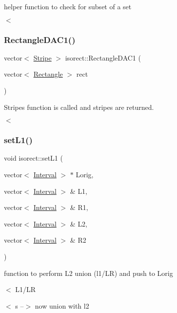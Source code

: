 helper function to check for subset of a set 

$<$ \mbox{\label{classisorect_af4d857e170d1935ef0e2a9b079bd7e57}} 
\subsubsection{\texorpdfstring{Rectangle\+D\+A\+C1()}{RectangleDAC1()}}
{\footnotesize\ttfamily vector$<$ \hyperlink{classStripe}{Stripe} $>$ isorect\+::\+Rectangle\+D\+A\+C1 (\begin{DoxyParamCaption}\item[{vector$<$ \hyperlink{classRectangle}{Rectangle} $>$}]{rect }\end{DoxyParamCaption})}



Stripes function is called and stripes are returned. 

$<$ \mbox{\label{classisorect_a0c292396ca5de5692da4130819e1edba}} 
\subsubsection{\texorpdfstring{set\+L1()}{setL1()}}
{\footnotesize\ttfamily void isorect\+::set\+L1 (\begin{DoxyParamCaption}\item[{vector$<$ \hyperlink{classInterval}{Interval} $>$ $\ast$}]{Lorig,  }\item[{vector$<$ \hyperlink{classInterval}{Interval} $>$ \&}]{L1,  }\item[{vector$<$ \hyperlink{classInterval}{Interval} $>$ \&}]{R1,  }\item[{vector$<$ \hyperlink{classInterval}{Interval} $>$ \&}]{L2,  }\item[{vector$<$ \hyperlink{classInterval}{Interval} $>$ \&}]{R2 }\end{DoxyParamCaption})}



function to perform L2 union (l1/\+LR) and push to Lorig 

$<$ L1/\+LR

$<$ s --$>$ now union with l2 \mbox{\label{classisorect_ac0bb316a2ec6e0003ae4f298e789c3f9}} 
